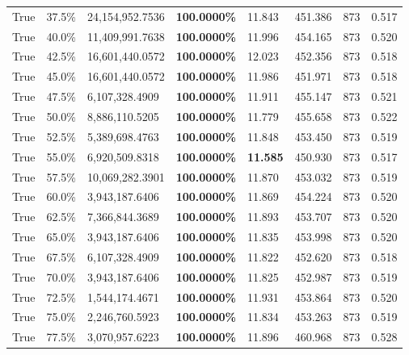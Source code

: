 \begin{table}[H]
{\begin{tabular}{lllrllll}
\cline{1-8}
True & 37.5\% & 24,154,952.7536 & \bfseries \color{red} 100.0000\% & 11.843 & 451.386 & 873 & 0.517 \\
\cline{1-8}
True & 40.0\% & 11,409,991.7638 & \bfseries \color{red} 100.0000\% & 11.996 & 454.165 & 873 & 0.520 \\
\cline{1-8}
True & 42.5\% & 16,601,440.0572 & \bfseries \color{red} 100.0000\% & 12.023 & 452.356 & 873 & 0.518 \\
\cline{1-8}
True & 45.0\% & 16,601,440.0572 & \bfseries \color{red} 100.0000\% & 11.986 & 451.971 & 873 & 0.518 \\
\cline{1-8}
True & 47.5\% & 6,107,328.4909 & \bfseries \color{red} 100.0000\% & 11.911 & 455.147 & 873 & 0.521 \\
\cline{1-8}
True & 50.0\% & 8,886,110.5205 & \bfseries \color{red} 100.0000\% & 11.779 & 455.658 & 873 & 0.522 \\
\cline{1-8}
True & 52.5\% & 5,389,698.4763 & \bfseries \color{red} 100.0000\% & 11.848 & 453.450 & 873 & 0.519 \\
\cline{1-8}
True & 55.0\% & 6,920,509.8318 & \bfseries \color{red} 100.0000\% & \bfseries \color{red} 11.585 & 450.930 & 873 & 0.517 \\
\cline{1-8}
True & 57.5\% & 10,069,282.3901 & \bfseries \color{red} 100.0000\% & 11.870 & 453.032 & 873 & 0.519 \\
\cline{1-8}
True & 60.0\% & 3,943,187.6406 & \bfseries \color{red} 100.0000\% & 11.869 & 454.224 & 873 & 0.520 \\
\cline{1-8}
True & 62.5\% & 7,366,844.3689 & \bfseries \color{red} 100.0000\% & 11.893 & 453.707 & 873 & 0.520 \\
\cline{1-8}
True & 65.0\% & 3,943,187.6406 & \bfseries \color{red} 100.0000\% & 11.835 & 453.998 & 873 & 0.520 \\
\cline{1-8}
True & 67.5\% & 6,107,328.4909 & \bfseries \color{red} 100.0000\% & 11.822 & 452.620 & 873 & 0.518 \\
\cline{1-8}
True & 70.0\% & 3,943,187.6406 & \bfseries \color{red} 100.0000\% & 11.825 & 452.987 & 873 & 0.519 \\
\cline{1-8}
True & 72.5\% & 1,544,174.4671 & \bfseries \color{red} 100.0000\% & 11.931 & 453.864 & 873 & 0.520 \\
\cline{1-8}
True & 75.0\% & 2,246,760.5923 & \bfseries \color{red} 100.0000\% & 11.834 & 453.263 & 873 & 0.519 \\
\cline{1-8}
True & 77.5\% & 3,070,957.6223 & \bfseries \color{red} 100.0000\% & 11.896 & 460.968 & 873 & 0.528 \\

\end{tabular}}
\end{table}
